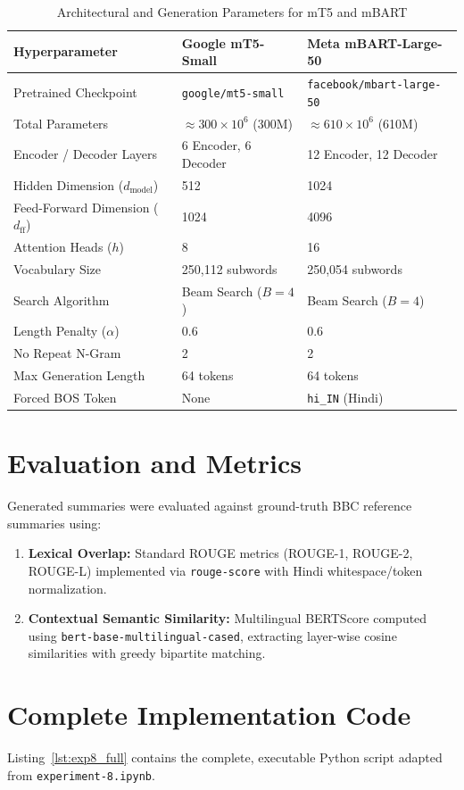 \documentclass[12pt,a4paper]{report}
\begin{document}
\begin{table}[H]
\centering
\caption{Architectural and Generation Parameters for mT5 and mBART}
\label{tab:exp8_models}
\begin{tabularx}{\textwidth}{lXX}
\toprule
\textbf{Hyperparameter} & \textbf{Google mT5-Small} & \textbf{Meta mBART-Large-50} \\
\midrule
Pretrained Checkpoint & \texttt{google/mt5-small} & \texttt{facebook/mbart-large-50} \\
Total Parameters & $\approx 300 \times 10^6$ (300M) & $\approx 610 \times 10^6$ (610M) \\
Encoder / Decoder Layers & 6 Encoder, 6 Decoder & 12 Encoder, 12 Decoder \\
Hidden Dimension ($d_{\text{model}}$) & 512 & 1024 \\
Feed-Forward Dimension ($d_{\text{ff}}$) & 1024 & 4096 \\
Attention Heads ($h$) & 8 & 16 \\
Vocabulary Size & 250,112 subwords & 250,054 subwords \\
Search Algorithm & Beam Search ($B=4$) & Beam Search ($B=4$) \\
Length Penalty ($\alpha$) & 0.6 & 0.6 \\
No Repeat N-Gram & 2 & 2 \\
Max Generation Length & 64 tokens & 64 tokens \\
Forced BOS Token & None & \texttt{hi\_IN} (Hindi) \\
\bottomrule
\end{tabularx}
\end{table}

\section{Evaluation and Metrics}
Generated summaries were evaluated against ground-truth BBC reference summaries using:
\begin{enumerate}
    \item \textbf{Lexical Overlap:} Standard ROUGE metrics (ROUGE-1, ROUGE-2, ROUGE-L) implemented via \texttt{rouge-score} with Hindi whitespace/token normalization.
    \item \textbf{Contextual Semantic Similarity:} Multilingual BERTScore computed using \texttt{bert-base-multilingual-cased}, extracting layer-wise cosine similarities with greedy bipartite matching.
\end{enumerate}

\section{Complete Implementation Code}
Listing~\ref{lst:exp8_full} contains the complete, executable Python script adapted from \texttt{experiment-8.ipynb}.
\end{document}
